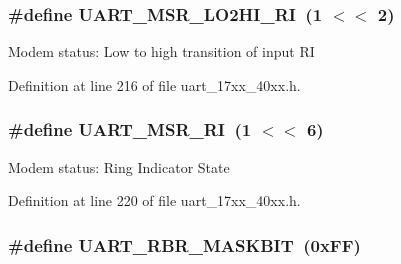 \subsubsection[{\texorpdfstring{U\+A\+R\+T\+\_\+\+M\+S\+R\+\_\+\+L\+O2\+H\+I\+\_\+\+RI}{UART_MSR_LO2HI_RI}}]{\setlength{\rightskip}{0pt plus 5cm}\#define U\+A\+R\+T\+\_\+\+M\+S\+R\+\_\+\+L\+O2\+H\+I\+\_\+\+RI~(1 $<$$<$ 2)}\hypertarget{group__UART__17XX__40XX_ga5b2defd6ffec805753fbf799838984ed}{}\label{group__UART__17XX__40XX_ga5b2defd6ffec805753fbf799838984ed}
Modem status\+: Low to high transition of input RI 

Definition at line 216 of file uart\+\_\+17xx\+\_\+40xx.\+h.

\subsubsection[{\texorpdfstring{U\+A\+R\+T\+\_\+\+M\+S\+R\+\_\+\+RI}{UART_MSR_RI}}]{\setlength{\rightskip}{0pt plus 5cm}\#define U\+A\+R\+T\+\_\+\+M\+S\+R\+\_\+\+RI~(1 $<$$<$ 6)}\hypertarget{group__UART__17XX__40XX_ga1f4efd8727007b41de36b8b6ab9d4f6b}{}\label{group__UART__17XX__40XX_ga1f4efd8727007b41de36b8b6ab9d4f6b}
Modem status\+: Ring Indicator State 

Definition at line 220 of file uart\+\_\+17xx\+\_\+40xx.\+h.

\subsubsection[{\texorpdfstring{U\+A\+R\+T\+\_\+\+R\+B\+R\+\_\+\+M\+A\+S\+K\+B\+IT}{UART_RBR_MASKBIT}}]{\setlength{\rightskip}{0pt plus 5cm}\#define U\+A\+R\+T\+\_\+\+R\+B\+R\+\_\+\+M\+A\+S\+K\+B\+IT~(0x\+F\+F)}\hypertarget{group__UART__17XX__40XX_ga06774e65c2ca095c4373122ed9a390b8}{}\label{group__UART__17XX__40XX_ga06774e65c2ca095c4373122ed9a390b8}


